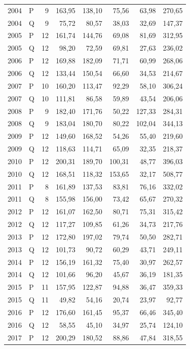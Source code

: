 \documentclass[10pt,a4paper]{article}
\begin{document}
\begin{longtable}{llrrrrrr}
2004 & P & 9 & 163,95 & 138,10 & 75,56 & 63,98 & 270,65 \\
2004 & Q & 9 & 75,72 & 80,57 & 38,03 & 32,69 & 147,37 \\
2005 & P & 12 & 161,74 & 144,76 & 69,08 & 81,69 & 312,95 \\
2005 & Q & 12 & 98,20 & 72,59 & 69,81 & 27,63 & 236,02 \\
2006 & P & 12 & 169,88 & 182,09 & 71,71 & 60,99 & 268,06 \\
2006 & Q & 12 & 133,44 & 150,54 & 66,60 & 34,53 & 214,67 \\
2007 & P & 10 & 160,20 & 113,47 & 92,29 & 58,10 & 306,24 \\
2007 & Q & 10 & 111,81 & 86,58 & 59,89 & 43,54 & 206,06 \\
2008 & P & 9 & 182,40 & 171,76 & 50,22 & 127,33 & 284,31 \\
2008 & Q & 9 & 183,04 & 180,70 & 80,22 & 102,04 & 344,13 \\
2009 & P & 12 & 149,60 & 168,52 & 54,26 & 55,40 & 219,60 \\
2009 & Q & 12 & 118,63 & 114,71 & 65,09 & 32,35 & 218,37 \\
2010 & P & 12 & 200,31 & 189,70 & 100,31 & 48,77 & 396,03 \\
2010 & Q & 12 & 168,51 & 118,32 & 153,65 & 32,17 & 508,77 \\
2011 & P & 8 & 161,89 & 137,53 & 83,81 & 76,16 & 332,02 \\
2011 & Q & 8 & 155,98 & 156,00 & 73,42 & 65,67 & 270,32 \\
2012 & P & 12 & 161,07 & 162,50 & 80,71 & 75,31 & 315,42 \\
2012 & Q & 12 & 117,27 & 109,85 & 61,26 & 34,73 & 217,76 \\
2013 & P & 12 & 172,80 & 197,02 & 79,74 & 50,50 & 282,71 \\
2013 & Q & 12 & 101,73 & 90,72 & 60,29 & 43,71 & 249,11 \\
2014 & P & 12 & 156,19 & 161,32 & 75,40 & 30,97 & 262,57 \\
2014 & Q & 12 & 101,66 & 96,20 & 45,67 & 36,19 & 181,35 \\
2015 & P & 11 & 157,95 & 122,87 & 94,88 & 36,47 & 359,33 \\
2015 & Q & 11 & 49,82 & 54,16 & 20,74 & 23,97 & 92,77 \\
2016 & P & 12 & 176,60 & 161,45 & 95,37 & 66,46 & 345,40 \\
2016 & Q & 12 & 58,55 & 45,10 & 34,97 & 25,74 & 124,10 \\
2017 & P & 12 & 200,29 & 180,52 & 88,86 & 47,84 & 318,55 \\

\end{longtable}
\end{document}
